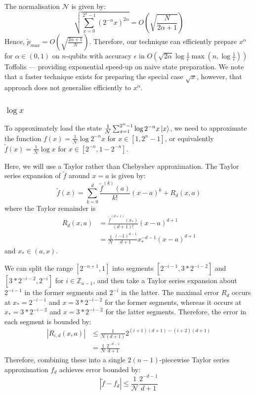 \documentclass[aps,prx,twocolumn,floatfix,10pt,amssymb,amsfont,amsmath,superscriptaddress,float,nofootinbib,longbibliography,nobalancelastpage]{revtex4-2}
\theoremstyle{empty}
\begin{document}
The normalisation $\mathcal{N}$ is given by:
\begin{equation}
    \sqrt{\sum_{x=0}^{2^n-1}(2^{-n} x)^{2\alpha}}  = O\left(\sqrt{\frac{N}{2\alpha+1}}\right)
\end{equation}
Hence, $\tilde{p}_{max} = O\left(\sqrt{\frac{2\alpha+1}{N}
}\right)$. Therefore, our technique can efficiently prepare $x^{\alpha}$ for $\alpha \in (0,1)$ on $n$-qubits with accuracy $\epsilon$ in $O(\sqrt{2\alpha} \log \frac{1}{\epsilon}\max(n, \log\frac{1}{\epsilon}))$ Toffolis --- providing exponential speed-up on naive state preparation. We note that a faster technique \cite{PhysRevLett.122.020502} exists for preparing the special case $\sqrt{x}$, however, that approach does not generalise efficiently to $x^{\alpha}$.

\subsubsection{$\log x$}
\label{section:inverse} To approximately load the state $\frac{1}{\mathcal{N}}\sum_{x=1}^{2^n-1} \log{2^{-n}x}\ket{x}$, we need to approximate the function $f(x) = \frac{1}{\mathcal{N}}\log{2^{-n}x}$ for $x \in [1, 2^n-1]$, or equivalently $\tilde f(x) =\frac{1}{\mathcal{N}}\log{x}$ for $x \in [2^{-n}, 1-2^{-n}]$. 

Here, we will use a Taylor rather than Chebyshev approximation. The Taylor series expansion of $\tilde f$ around $x=a$ is given by:
\begin{equation}
        \tilde f(x) = \sum_{k=0}^d \frac{\tilde{f}^{(k)}(a)}{k!}(x-a)^k + R_d(x,a)
\end{equation}
where the Taylor remainder is
\begin{align}
    R_d(x,a) &= \frac{\tilde{f}^{(d+1)}(x_*)}{(d+1)!}(x-a)^{d+1} \nonumber \\
            &= \frac{1}{\mathcal{N}} \frac{(-1)^{d-1}}{d+1} x_*^{-d-1}(x-a)^{d+1}
\end{align}
and $x_* \in (a,x)$.

We can split the range $[2^{-n+1}, 1]$ into segments $[2^{-i-1}, 3*2^{-i-2}]$ and $[3*2^{-i-2}, 2^{-i}]$ for $i \in \mathbb{Z}_{n-1}$, and then take a Taylor series expansion about $2^{-i-1}$ in the former segments and $2^{-i}$ in the latter. The maximal error $R_d$ occurs at $x_* = 2^{-i-1}$ and $x=3*2^{-i-2}$ for the former segments, whereas it occurs at $x_* = 3*2^{-i-2}$ and $x=3*2^{-i-2}$ for the latter segments. Therefore, the error in each segment is bounded by:
\begin{align}
    |R_{i,d}(x,a)| &\leq \frac{1}{\mathcal{N}(d+1)}  2^{(i+1)(d+1)-(i+2)(d+1)} \nonumber\\
                &= \frac{1}{\mathcal{N}} \frac{2^{-d-1}}{d+1}
\end{align}
Therefore, combining these into a single $2(n-1)$-piecewise Taylor series approximation $f_d$ achieves error bounded by:
\begin{equation}
     |\tilde f - f_{d}| \leq   \frac{1}{\mathcal{N}} \frac{2^{-d-1}}{d+1}
\end{equation}
\end{document}
